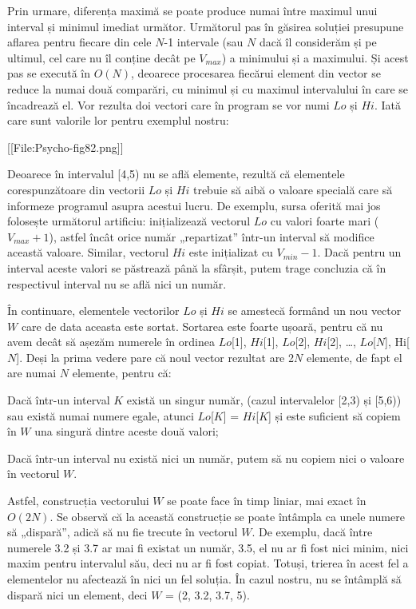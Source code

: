 Prin urmare, diferența maximă se poate produce numai între maximul unui interval și minimul imediat următor. Următorul pas în găsirea soluției presupune aflarea pentru fiecare din cele $N$-1 intervale (sau $N$ dacă îl considerăm și pe ultimul, cel care nu îl conține decât pe $V_{\mathit{max}}$) a minimului și a maximului. Și acest pas se execută în $O(N)$, deoarece procesarea fiecărui element din vector se reduce la numai două comparări, cu minimul și cu maximul intervalului în care se încadrează el. Vor rezulta doi vectori care în program se vor numi $Lo$ și $Hi$. Iată care sunt valorile lor pentru exemplul nostru:

[[File:Psycho-fig82.png]]

Deoarece în intervalul [4,5) nu se află elemente, rezultă că elementele corespunzătoare din vectorii $Lo$ și $Hi$ trebuie să aibă o valoare specială care să informeze programul asupra acestui lucru. De exemplu, sursa oferită mai jos folosește următorul artificiu: inițializează vectorul $Lo$ cu valori foarte mari ($V_{\mathit{max}} + 1$), astfel încât orice număr „repartizat” într-un interval să modifice această valoare. Similar, vectorul $Hi$ este inițializat cu $V_{\mathit{min}} - 1$. Dacă pentru un interval aceste valori se păstrează până la sfârșit, putem trage concluzia că în respectivul interval nu se află nici un număr.

În continuare, elementele vectorilor $Lo$ și $Hi$ se amestecă formând un nou vector $W$ care de data aceasta este sortat. Sortarea este foarte ușoară, pentru că nu avem decât să așezăm numerele în ordinea $Lo$[1], $Hi$[1], $Lo$[2], $Hi$[2], \dots, $Lo$[$N$], Hi[$N$]. Deși la prima vedere pare că noul vector rezultat are 2$N$ elemente, de fapt el are numai $N$ elemente, pentru că:

\item Dacă într-un interval $K$ există un singur număr, (cazul intervalelor [2,3) și [5,6)) sau există numai numere egale, atunci $Lo$[$K$] = $Hi$[$K$] și este suficient să copiem în $W$ una singură dintre aceste două valori;
\item Dacă într-un interval nu există nici un număr, putem să nu copiem nici o valoare în vectorul $W$.

Astfel, construcția vectorului $W$ se poate face în timp liniar, mai exact în $O(2N)$. Se observă că la această construcție se poate întâmpla ca unele numere să „dispară”, adică să nu fie trecute în vectorul $W$. De exemplu, dacă între numerele 3.2 și 3.7 ar mai fi existat un număr, 3.5, el nu ar fi fost nici minim, nici maxim pentru intervalul său, deci nu ar fi fost copiat. Totuși, trierea în acest fel a elementelor nu afectează în nici un fel soluția. În cazul nostru, nu se întâmplă să dispară nici un element, deci $W$ = (2, 3.2, 3.7, 5).

